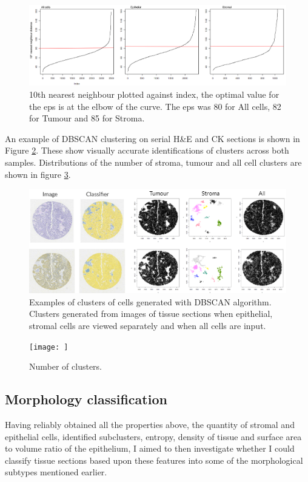 \begin{figure}
    \centering
    \includegraphics[width=\textwidth]{Chapter3/Figs/Thesis-11.png}
    \caption{10th nearest neighbour plotted against index, the optimal value for the eps is at the elbow of the curve. The eps was 80 for All cells, 82 for Tumour and 85 for Stroma.}
    \label{fig:eps}
\end{figure}

An example of DBSCAN clustering on serial H\&E and CK sections is shown in Figure \ref{fig:dbclust}. These show visually accurate identifications of clusters across both samples. Distributions of the number of stroma, tumour and all cell clusters are shown in figure \ref{fig:dbscatter}.

\begin{figure}
    \centering
    \includegraphics[width=\textwidth]{Chapter3/Figs/dbscan_fullexample.png}
    \caption{Examples of clusters of cells generated with DBSCAN algorithm. Clusters generated from images of tissue sections when epithelial, stromal cells are viewed separately and when all cells are input.}
    \label{fig:dbclust}
\end{figure}

\begin{figure}
    \centering
    \texttt{[image: ]}
    \caption{Number of clusters.}
    \label{fig:dbscatter}
\end{figure}



\subsection{Morphology classification}
Having reliably obtained all the properties above, the quantity of stromal and epithelial cells, identified subclusters, entropy, density of tissue and surface area to volume ratio of the epithelium, I aimed to then investigate whether I could classify tissue sections based upon these features into some of the morphological subtypes mentioned earlier.

